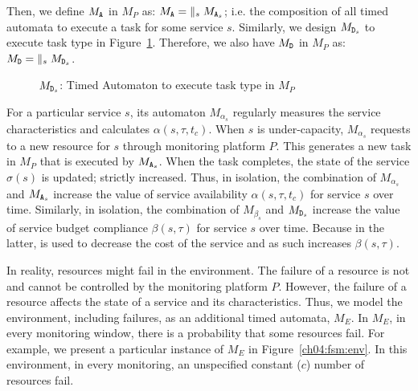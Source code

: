 Then, we define $M_{{\scriptsize\texttt{A}}}$ in $M_P$ as:
$M_{{\scriptsize\texttt{A}}} = \; \parallel_s M_{{\scriptsize\texttt{A}}_s}$; i.e.
the composition of all timed automata to execute a task  for some service $s$.
% 
Similarly, we design $M_{{\scriptsize\texttt{D}}_s}$ to execute task type  in Figure~\ref{ch04:fig:fsm:dealloc_s}.
Therefore, we also have $M_{{\scriptsize\texttt{D}}}$ in $M_P$ as: $M_{{\scriptsize\texttt{D}}} = \; \parallel_s M_{{\scriptsize\texttt{D}}_s}$.
% 
\begin{figure}[h!]
\centering
{}
\caption{$M_{{\scriptsize\texttt{D}}_s}$: Timed Automaton to execute task type  in $M_P$}
\label{ch04:fig:fsm:dealloc_s}
\end{figure}
% 

For a particular service $s$, its automaton $M_{\alpha_s}$ regularly measures the service
characteristics and calculates $\alpha(s,\tau,t_c)$. When $s$ is under-capacity, $M_{\alpha_s}$ requests to  a new resource for $s$ through monitoring platform $P$.
This generates a new task in $M_P$ that is executed by $M_{{\scriptsize\texttt{A}}_s}$.
When the task completes, the state of the service $\sigma(s)$ is updated; strictly increased.
Thus, in isolation, the combination of $M_{\alpha_s}$ and $M_{{\scriptsize\texttt{A}}_s}$ increase the value of service availability $\alpha(s,\tau,t_c)$ for service $s$ over time.
Similarly, in isolation, the combination of $M_{\beta_s}$ and $M_{{\scriptsize\texttt{D}}_s}$ increase the value of service budget compliance $\beta(s,\tau)$ for service $s$ over time. 
Because in the latter,  is used to decrease the cost of the service and as such increases $\beta(s,\tau)$. 

In reality, resources might fail in the environment.
The failure of a resource is not and cannot be controlled by the monitoring platform $P$.
However, the failure of a resource affects the state of a service and its characteristics.
Thus, we model the environment, including failures, as an additional timed automata, $M_E$.
In $M_E$, in every monitoring window, there is a probability that some resources fail.
For example, we present a particular instance of $M_E$ in Figure~\ref{ch04:fsm:env}.
In this environment, in every monitoring, an unspecified constant ($c$) number of resources fail.


